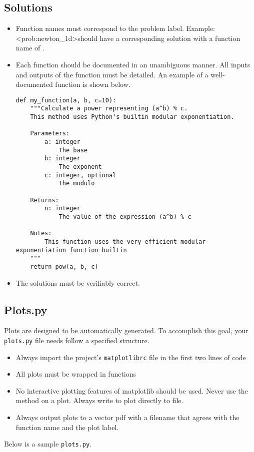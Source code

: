 \subsection{Solutions}
\begin{itemize}
\item Function names must correspond to the problem label.
Example: \textless prob:newton\_1d\textgreater should have a corresponding solution with a function name of .
\item Each function should be documented in an unambiguous manner.
All inputs and outputs of the function must be detailed.
An example of a well-documented function is shown below.
\begin{lstlisting}
def my_function(a, b, c=10):
    """Calculate a power representing (a^b) % c.
    This method uses Python's builtin modular exponentiation.
    
    Parameters:
        a: integer
            The base
        b: integer
            The exponent
        c: integer, optional
            The modulo
            
    Returns:
        n: integer
            The value of the expression (a^b) % c
            
    Notes:
        This function uses the very efficient modular exponentiation function builtin
    """
    return pow(a, b, c)
\end{lstlisting}

\item The solutions must be verifiably correct.
\end{itemize}

\subsection{Plots.py}
Plots are designed to be automatically generated.
To accomplish this goal, your \texttt{plots.py} file needs follow a specified structure.
\begin{itemize}
\item Always import the project's \texttt{matplotlibrc} file in the first two lines of code
\item All plots must be wrapped in functions
\item No interactive plotting features of matplotlib should be used.  Never use the  method on a plot.  Always write to plot directly to file.
\item Always output plots to a vector pdf with a filename that agrees with the function name and the plot label.
\end{itemize}
Below is a sample \texttt{plots.py}.




